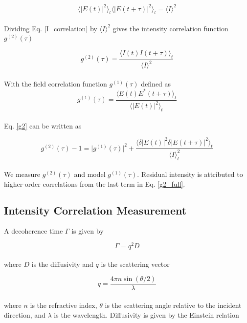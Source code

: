 \documentclass{article}
\begin{document}
\begin{equation}\label{E_correlation_term1}
    \langle \left| E\left(t \right)\right|^2 \rangle_t \langle \left| E \left(t+\tau \right)\right|^2 \rangle_t = \langle I \rangle ^2
\end{equation}
\\
Dividing Eq. \ref{I_correlation} by $\langle I \rangle ^2$ gives the intensity correlation function $g^{(2)}(\tau)$

\begin{equation}\label{g2}
    g^{(2)}(\tau) = \frac{\langle I(t)I(t + \tau) \rangle_t}{\langle I \rangle ^2}
\end{equation}
\\
With the field correlation function $g^{(1)}(\tau)$ defined as
\begin{equation}\label{g1}
    g^{(1)}(\tau) = \frac{ \langle E(t)  E^*(t + \tau) \rangle_t } 
    {\langle \vert E(t) \vert^2 \rangle_t}
\end{equation}
\\
Eq. \ref{g2} can be written as

\begin{equation}\label{g2_full}
    g^{(2)}(\tau) - 1 = \big \vert g^{(1)}(\tau) \big \vert^2 + \frac{\langle \delta \left| E \left(t\right)\right|^2 \delta\left| E \left(t+\tau \right)\right|^2\rangle_t}{\langle I \rangle_t^2}
\end{equation}
\\
We measure $g^{(2)}(\tau)$ and model $g^{(1)}(\tau)$. Residual intensity is attributed to higher-order correlations from the last term in Eq. \ref{g2_full}.


\subsection{Intensity Correlation Measurement}
A decoherence time $\Gamma$ is given by

\begin{equation}\label{Gamma}
    \Gamma = q^2 D
\end{equation}
\\
where $D$ is the diffusivity and $q$ is the scattering vector

\begin{equation}\label{q}
    q = \frac{4 \pi n \sin (\theta/2)}{\lambda}
\end{equation}
\\
where $n$ is the refractive index, $\theta$ is the scattering angle relative to the incident direction, and $\lambda$ is the wavelength.
Diffusivity is given by the Einstein relation
\end{document}
